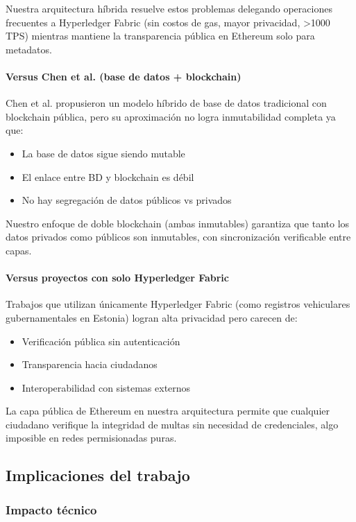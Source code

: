 Nuestra arquitectura híbrida resuelve estos problemas delegando operaciones frecuentes a Hyperledger Fabric (sin costos de gas, mayor privacidad, >1000 TPS) mientras mantiene la transparencia pública en Ethereum solo para metadatos.

\paragraph{Versus Chen et al. (base de datos + blockchain)}
Chen et al. propusieron un modelo híbrido de base de datos tradicional con blockchain pública, pero su aproximación no logra inmutabilidad completa ya que:
\begin{itemize}
    \item La base de datos sigue siendo mutable
    \item El enlace entre BD y blockchain es débil
    \item No hay segregación de datos públicos vs privados
\end{itemize}

Nuestro enfoque de doble blockchain (ambas inmutables) garantiza que tanto los datos privados como públicos son inmutables, con sincronización verificable entre capas.

\paragraph{Versus proyectos con solo Hyperledger Fabric}
Trabajos que utilizan únicamente Hyperledger Fabric (como registros vehiculares gubernamentales en Estonia) logran alta privacidad pero carecen de:
\begin{itemize}
    \item Verificación pública sin autenticación
    \item Transparencia hacia ciudadanos
    \item Interoperabilidad con sistemas externos
\end{itemize}

La capa pública de Ethereum en nuestra arquitectura permite que cualquier ciudadano verifique la integridad de multas sin necesidad de credenciales, algo imposible en redes permisionadas puras.

\subsection{Implicaciones del trabajo}

\subsubsection{Impacto técnico}


